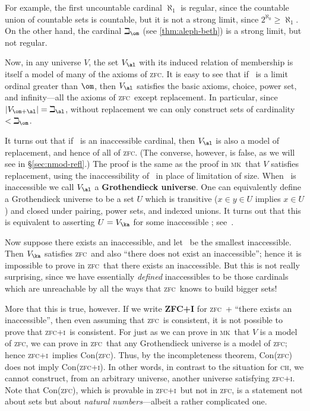 \documentclass{amsart}
\def\zfc{\textsc{zfc}}
\def\zfci{\textsc{zfc+i}}
\def\mk{\textsc{mk}}
\def\ch{\textsc{ch}}
\begin{document}
For example, the first uncountable cardinal $\aleph_1$ is regular,
since the countable union of countable sets is countable, but it is
not a strong limit, since $2^{\aleph_0} \ge \aleph_1$.  On the other
hand, the cardinal $\beth_\om$ (see \autoref{thm:aleph-beth}) is a
strong limit, but not regular.


Now, in any universe $V$, the set $V_\al$ with its induced relation of
membership is itself a model of many of the axioms of \zfc.  It is
easy to see that if \al\ is a limit ordinal greater than $\om$, then
$V_\al$ satisfies the basic axioms, choice, power set, and
infinity---all the axioms of \zfc\ except replacement.  In particular,
since $|V_{\om+\al}| = \beth_{\al}$, without replacement we can only
construct sets of cardinality $<\beth_\om$.

It turns out that if \al\ is an inaccessible cardinal, then $V_\al$ is
also a model of replacement, and hence of all of \zfc.  (The converse,
however, is false, as we will see in \S\ref{sec:nmod-refl}.)  The
proof is the same as the proof in \mk\ that $V$ satisfies replacement,
using the inaccessibility of \al\ in place of limitation of size.
When \al\ is inaccessible we call $V_\al$ a \textbf{Grothendieck
  universe}.  One can equivalently define a Grothendieck universe to
be a set $U$ which is transitive ($x\in y\in U$ implies $x\in U$) and
closed under pairing, power sets, and indexed unions.  It turns out
that this is equivalent to asserting $U=V_\ka$ for some inaccessible
\ka; see~\cite{bourbaki:universe}.

Now suppose there exists an inaccessible, and let \ka\ be the smallest
inaccessible.  Then $V_\ka$ satisfies \zfc\ and also ``there does not
exist an inaccessible''; hence it is impossible to prove in \zfc\ that
there exists an inaccessible.  But this is not really surprising,
since we have essentially \emph{defined} inaccessibles to be those
cardinals which are unreachable by all the ways that \zfc\ knows to
build bigger sets!

More that this is true, however.  If we write \textbf{ZFC+I} for \zfc\
+ ``there exists an inaccessible'', then even assuming that \zfc\ is
consistent, it is not possible to prove that \zfci\ is consistent.
For just as we can prove in \mk\ that $V$ is a model of \zfc, we can
prove in \zfc\ that any Grothendieck universe is a model of \zfc;
hence \zfci\ implies Con(\zfc).  Thus, by the incompleteness theorem,
Con(\zfc) does not imply Con(\zfci).  In other words, in contrast to
the situation for \ch, we cannot construct, from an arbitrary
universe, another universe satisfying \zfci.  Note that Con(\zfc),
which is provable in \zfci\ but not in \zfc, is a statement not about
sets but about \emph{natural numbers}---albeit a rather complicated
one.
\end{document}
